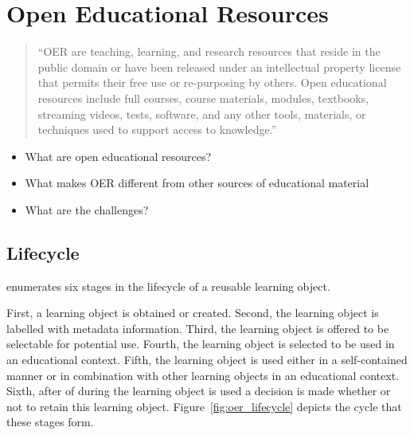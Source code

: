\section{Open Educational Resources}
\begin{quote}
``OER are teaching, learning, and research resources that reside in the public domain or have
been released under an intellectual property license that permits their free
use or re-purposing by others. Open educational resources include full courses,
course materials, modules, textbooks, streaming videos, tests, software, and
any other tools, materials, or techniques used to support access to
knowledge.''
\end{quote}
\begin{itemize}
	\item What are open educational resources?
	\item What makes OER different from other sources of educational material
	\item What are the challenges?
\end{itemize}

\subsection{Lifecycle}
\label{sec:background_oer_lifecycle}
\citet{Collis2004}
enumerates six stages in the lifecycle of a reusable learning object. 

First, a learning object is obtained or created. Second, the learning object is labelled
with metadata information. Third, the learning object is offered to be
selectable for potential use.  Fourth, the learning object is selected
to be used in an educational context. Fifth, the learning object is used either in a
self-contained manner or in combination with other learning objects in an
educational context. Sixth, after of during the learning object is used a
decision is made whether or not to retain this learning object.
Figure~\ref{fig:oer_lifecycle} depicts the cycle that these stages form.

